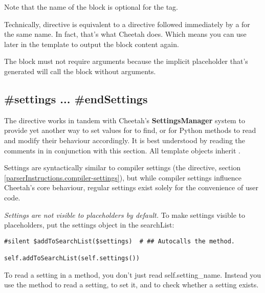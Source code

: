 Note that the name of the block is optional for the  tag.

Technically,  directive is equivalent to a  directive
followed immediately by a  for the same name.  In fact,
that's what Cheetah does.  Which means you can use 
later in the template to output the block content again.

The block must not require arguments because the implicit placeholder that's
generated will call the block without arguments.


\subsection{\#settings ... \#endSettings}
\label{inheritanceEtc.settings}

The  directive works in tandem with Cheetah's
{\bf SettingsManager} system to provide yet another way to set values for
 to find, or for Python methods to read and modify their
behaviour accordingly.  It is best understood by reading the comments in
 in conjunction with this section.  All 
template objects inherit .

Settings are syntactically similar to compiler settings (the
 directive, section
\ref{parserInstructions.compiler-settings}), but while compiler settings
influence Cheetah's core behaviour, regular settings exist solely for the
convenience of user code.

{\em Settings are not visible to placeholders by default.}  To make settings
visible to placeholders, put the settings object in the searchList:  

\begin{verbatim}
#silent $addToSearchList($settings)  # ## Autocalls the method.

self.addToSearchList(self.settings())
\end{verbatim}


To read a setting in a method, you don't just read self.setting\_name.  Instead
you use the  method to read a setting,
 to set it, and  to
check whether a setting exists.  

